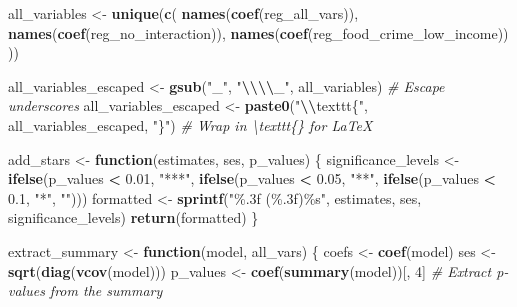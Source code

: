 \documentclass[
]{article}
\newenvironment{Shaded}{\begin{snugshade}}{\end{snugshade}}
\newcommand{\CommentTok}[1]{\textcolor[rgb]{0.56,0.35,0.01}{\textit{#1}}}
\newcommand{\ControlFlowTok}[1]{\textcolor[rgb]{0.13,0.29,0.53}{\textbf{#1}}}
\newcommand{\DecValTok}[1]{\textcolor[rgb]{0.00,0.00,0.81}{#1}}
\newcommand{\FloatTok}[1]{\textcolor[rgb]{0.00,0.00,0.81}{#1}}
\newcommand{\FunctionTok}[1]{\textcolor[rgb]{0.13,0.29,0.53}{\textbf{#1}}}
\newcommand{\NormalTok}[1]{#1}
\newcommand{\OtherTok}[1]{\textcolor[rgb]{0.56,0.35,0.01}{#1}}
\newcommand{\SpecialCharTok}[1]{\textcolor[rgb]{0.81,0.36,0.00}{\textbf{#1}}}
\newcommand{\StringTok}[1]{\textcolor[rgb]{0.31,0.60,0.02}{#1}}
\begin{document}
\begin{Shaded}
\begin{Highlighting}[]
\NormalTok{all\_variables }\OtherTok{\textless{}{-}} \FunctionTok{unique}\NormalTok{(}\FunctionTok{c}\NormalTok{(}
  \FunctionTok{names}\NormalTok{(}\FunctionTok{coef}\NormalTok{(reg\_all\_vars)),}
  \FunctionTok{names}\NormalTok{(}\FunctionTok{coef}\NormalTok{(reg\_no\_interaction)),}
  \FunctionTok{names}\NormalTok{(}\FunctionTok{coef}\NormalTok{(reg\_food\_crime\_low\_income))}
\NormalTok{))}

\NormalTok{all\_variables\_escaped }\OtherTok{\textless{}{-}} \FunctionTok{gsub}\NormalTok{(}\StringTok{"\_"}\NormalTok{, }\StringTok{"}\SpecialCharTok{\textbackslash{}\textbackslash{}\textbackslash{}\textbackslash{}}\StringTok{\_"}\NormalTok{, all\_variables)  }\CommentTok{\# Escape underscores}
\NormalTok{all\_variables\_escaped }\OtherTok{\textless{}{-}} \FunctionTok{paste0}\NormalTok{(}\StringTok{"}\SpecialCharTok{\textbackslash{}\textbackslash{}}\StringTok{texttt\{"}\NormalTok{, all\_variables\_escaped, }\StringTok{"\}"}\NormalTok{)  }\CommentTok{\# Wrap in \textbackslash{}texttt\{\} for LaTeX}

\NormalTok{add\_stars }\OtherTok{\textless{}{-}} \ControlFlowTok{function}\NormalTok{(estimates, ses, p\_values) \{}
\NormalTok{  significance\_levels }\OtherTok{\textless{}{-}} \FunctionTok{ifelse}\NormalTok{(p\_values }\SpecialCharTok{\textless{}} \FloatTok{0.01}\NormalTok{, }\StringTok{"***"}\NormalTok{,}
                          \FunctionTok{ifelse}\NormalTok{(p\_values }\SpecialCharTok{\textless{}} \FloatTok{0.05}\NormalTok{, }\StringTok{"**"}\NormalTok{,}
                          \FunctionTok{ifelse}\NormalTok{(p\_values }\SpecialCharTok{\textless{}} \FloatTok{0.1}\NormalTok{, }\StringTok{"*"}\NormalTok{, }\StringTok{""}\NormalTok{)))}
\NormalTok{  formatted }\OtherTok{\textless{}{-}} \FunctionTok{sprintf}\NormalTok{(}\StringTok{"\%.3f (\%.3f)\%s"}\NormalTok{, estimates, ses, significance\_levels)}
  \FunctionTok{return}\NormalTok{(formatted)}
\NormalTok{\}}

\NormalTok{extract\_summary }\OtherTok{\textless{}{-}} \ControlFlowTok{function}\NormalTok{(model, all\_vars) \{}
\NormalTok{  coefs }\OtherTok{\textless{}{-}} \FunctionTok{coef}\NormalTok{(model)}
\NormalTok{  ses }\OtherTok{\textless{}{-}} \FunctionTok{sqrt}\NormalTok{(}\FunctionTok{diag}\NormalTok{(}\FunctionTok{vcov}\NormalTok{(model)))}
\NormalTok{  p\_values }\OtherTok{\textless{}{-}} \FunctionTok{coef}\NormalTok{(}\FunctionTok{summary}\NormalTok{(model))[, }\DecValTok{4}\NormalTok{]  }\CommentTok{\# Extract p{-}values from the summary}


\end{Highlighting}
\end{Shaded}
\end{document}
